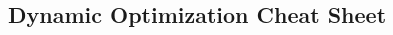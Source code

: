 \documentclass[a4paper]{article}
\theoremstyle{definition}
\begin{document}
\begin{multicols*}{4}
    \section*{
        Dynamic Optimization Cheat Sheet
    }
\end{multicols*}
\end{document}

